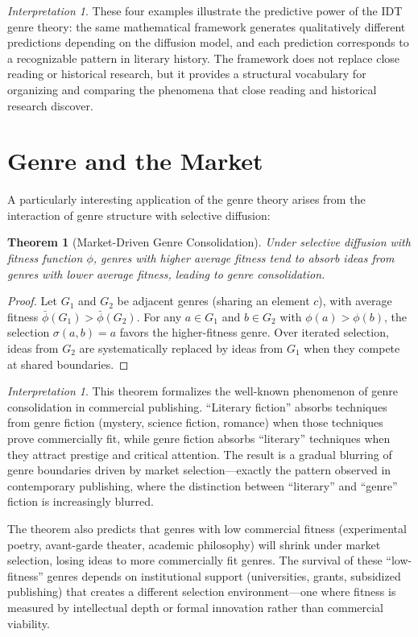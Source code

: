 \documentclass[11pt,openany]{book}
\theoremstyle{definition}
\theoremstyle{plain}
\newtheorem{theorem}[axiom]{Theorem}
\theoremstyle{remark}
\newtheorem{interpretation}[axiom]{Interpretation}
\begin{document}
\begin{interpretation}
These four examples illustrate the predictive power of the IDT genre theory: the same mathematical framework generates qualitatively different predictions depending on the diffusion model, and each prediction corresponds to a recognizable pattern in literary history. The framework does not replace close reading or historical research, but it provides a structural vocabulary for organizing and comparing the phenomena that close reading and historical research discover.
\end{interpretation}

\section{Genre and the Market}

A particularly interesting application of the genre theory arises from the interaction of genre structure with selective diffusion:

\begin{theorem}[Market-Driven Genre Consolidation]
Under selective diffusion with fitness function $\phi$, genres with higher average fitness tend to absorb ideas from genres with lower average fitness, leading to genre consolidation.
\end{theorem}

\begin{proof}
Let $G_1$ and $G_2$ be adjacent genres (sharing an element $c$), with average fitness $\bar\phi(G_1) > \bar\phi(G_2)$. For any $a \in G_1$ and $b \in G_2$ with $\phi(a) > \phi(b)$, the selection $\sigma(a, b) = a$ favors the higher-fitness genre. Over iterated selection, ideas from $G_2$ are systematically replaced by ideas from $G_1$ when they compete at shared boundaries.
\end{proof}

\begin{interpretation}
This theorem formalizes the well-known phenomenon of genre consolidation in commercial publishing. ``Literary fiction'' absorbs techniques from genre fiction (mystery, science fiction, romance) when those techniques prove commercially fit, while genre fiction absorbs ``literary'' techniques when they attract prestige and critical attention. The result is a gradual blurring of genre boundaries driven by market selection---exactly the pattern observed in contemporary publishing, where the distinction between ``literary'' and ``genre'' fiction is increasingly blurred.

The theorem also predicts that genres with low commercial fitness (experimental poetry, avant-garde theater, academic philosophy) will shrink under market selection, losing ideas to more commercially fit genres. The survival of these ``low-fitness'' genres depends on institutional support (universities, grants, subsidized publishing) that creates a different selection environment---one where fitness is measured by intellectual depth or formal innovation rather than commercial viability.
\end{interpretation}
\end{document}
